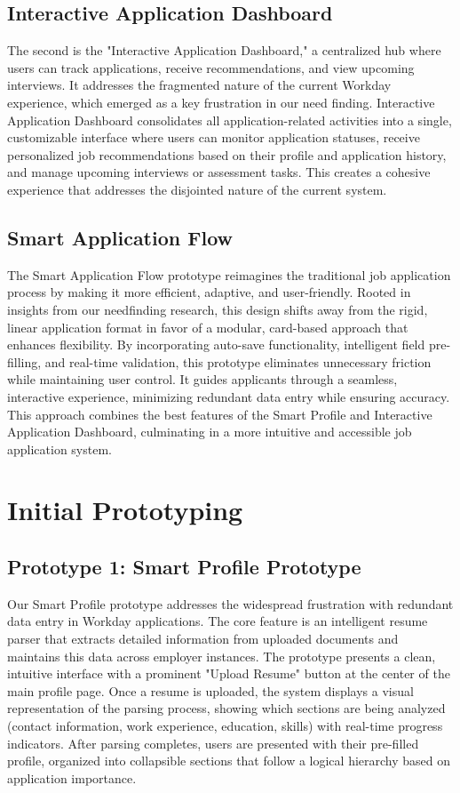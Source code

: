 \documentclass[
	letterpaper, %
]{jdf}
\begin{document}
\begin{sloppypar}
\subsection{Interactive Application Dashboard}
The second is the "Interactive Application Dashboard," a centralized hub where users can track applications, receive recommendations, and view upcoming interviews. It addresses the fragmented nature of the current Workday experience, which emerged as a key frustration in our need finding. Interactive Application Dashboard consolidates all application-related activities into a single, customizable interface where users can monitor application statuses, receive personalized job recommendations based on their profile and application history, and manage upcoming interviews or assessment tasks. This creates a cohesive experience that addresses the disjointed nature of the current system.

\subsection{Smart Application Flow}
The Smart Application Flow prototype reimagines the traditional job application process by making it more efficient, adaptive, and user-friendly. Rooted in insights from our needfinding research, this design shifts away from the rigid, linear application format in favor of a modular, card-based approach that enhances flexibility. By incorporating auto-save functionality, intelligent field pre-filling, and real-time validation, this prototype eliminates unnecessary friction while maintaining user control. It guides applicants through a seamless, interactive experience, minimizing redundant data entry while ensuring accuracy. This approach combines the best features of the Smart Profile and Interactive Application Dashboard, culminating in a more intuitive and accessible job application system.
\hfill \break

\section{Initial Prototyping}
\subsection{Prototype 1: Smart Profile Prototype}
Our Smart Profile prototype addresses the widespread frustration with redundant data entry in Workday applications. The core feature is an intelligent resume parser that extracts detailed information from uploaded documents and maintains this data across employer instances.
The prototype presents a clean, intuitive interface with a prominent "Upload Resume" button at the center of the main profile page. Once a resume is uploaded, the system displays a visual representation of the parsing process, showing which sections are being analyzed (contact information, work experience, education, skills) with real-time progress indicators. After parsing completes, users are presented with their pre-filled profile, organized into collapsible sections that follow a logical hierarchy based on application importance.


\end{sloppypar}
\end{document}
